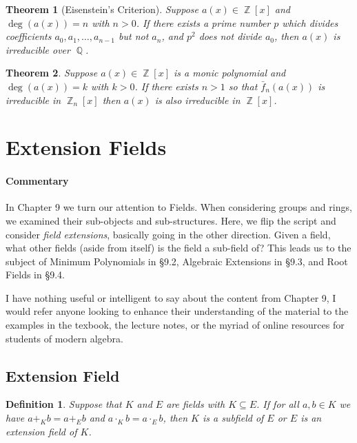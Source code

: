 \documentclass[letterpaper, 12pt]{article}
\DeclareMathOperator{\Z}{\mathbb{Z}}
\DeclareMathOperator{\Q}{\mathbb{Q}}
\newtheorem{defn}{Definition}
\newtheorem{thm}{Theorem}
\begin{document}
			\setcounter{thm}{34}
			\begin{thm}[Eisenstein's Criterion]
			Suppose $a(x) \in \Z[x]$ and $\deg(a(x)) = n$ with $n > 0$. 
			If there exists a prime number $p$ which divides coefficients $a_{0}, a_{1}, \dots, a_{n-1}$ but not $a_{n}$, and $p^{2}$ does not divide $a_{0}$, then $a(x)$ is irreducible over $\Q$.
			\end{thm}

			\setcounter{thm}{36}
			\begin{thm}
			Suppose $a(x) \in \Z[x]$ is a monic polynomial and $\deg(a(x)) = k$ with $k > 0$. 
			If there exists $n > 1$ so that $\bar{f}_{n}(a(x))$ is irreducible in $\Z_{n}[x]$ then $a(x)$ is also irreducible in $\Z[x]$.
			\end{thm}

	\section{Extension Fields}
	\label{sec:extension_fields}
		\paragraph{\color{blue}Commentary}
		\color{blue}
		In Chapter 9 we turn our attention to Fields.
		When considering groups and rings, we examined their sub-objects and sub-structures.
		Here, we flip the script and consider \textit{field extensions}, basically going in the other direction.
		Given a field, what other fields (aside from itself) is the field a sub-field of?
		This leads us to the subject of Minimum Polynomials in \S 9.2, Algebraic Extensions in \S 9.3, and Root Fields in \S 9.4.

		I have nothing useful or intelligent to say about the content from Chapter 9, I would refer anyone looking to enhance their understanding of the material to the examples in the texbook, the lecture notes, or the myriad of online resources for students of modern algebra.
		\color{black}

		\setcounter{defn}{0}
		\setcounter{thm}{0}

		\subsection{Extension Field}
		\label{sec:extension_field}
			\begin{defn}
			Suppose that $K$ and $E$ are fields with $K \subseteq E$.
			If for all $a,b \in K$ we have $a +_{K} b = a +_{E} b$ and $a \cdot_{K} b = a \cdot_{E} b$, then $K$ is a subfield of $E$ or $E$ is an extension field of $K$.
			\end{defn}
\end{document}
